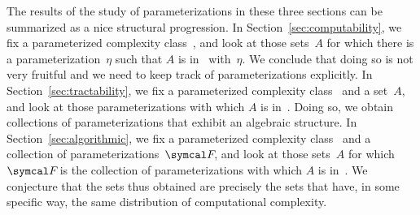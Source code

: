 The results of the study of parameterizations in these three sections can be summarized as a nice structural progression.
In Section~\ref{sec:computability}, we fix a parameterized complexity class~, and look at those sets~$A$ for which there is a parameterization~$\eta$ such that $A$ is in~ with~$\eta$.
We conclude that doing so is not very fruitful and we need to keep track of parameterizations explicitly.
In Section~\ref{sec:tractability}, we fix a parameterized complexity class~ and a set~$A$, and look at those parameterizations with which $A$ is in~.
Doing so, we obtain collections of parameterizations that exhibit an algebraic structure.
In Section~\ref{sec:algorithmic}, we fix a parameterized complexity class~ and a collection of parameterizations~$\calF$, and look at those sets~$A$ for which $\calF$ is the collection of parameterizations with which $A$ is in~.
We conjecture that the sets thus obtained are precisely the sets that have, in some specific way, the same distribution of computational complexity.















